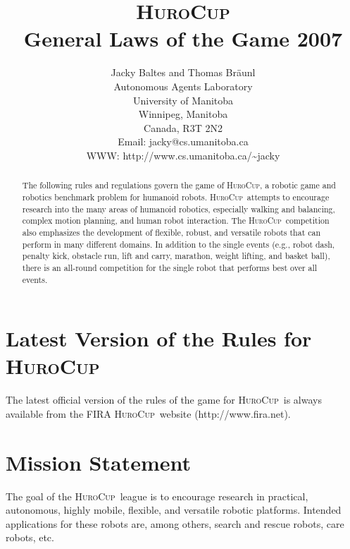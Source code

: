 \documentclass[12pt]{article}
\newcommand{\HuroCup}{\textsc{HuroCup}}
\begin{document}
\title{\HuroCup\\
  General Laws of the Game 2007}

\author{Jacky Baltes and Thomas Br\"aunl\\
Autonomous Agents Laboratory\\
University of Manitoba\\
Winnipeg, Manitoba\\
Canada, R3T 2N2\\
Email: jacky@cs.umanitoba.ca\\
WWW: http://www.cs.umanitoba.ca/\~{ }jacky
}

\maketitle
\begin{abstract}
The following rules and regulations govern the game of \HuroCup, a
robotic game and robotics benchmark problem for humanoid
robots. 
%
\HuroCup\ attempts to encourage research into the many areas
of humanoid robotics, especially walking and balancing, complex motion
planning, and human robot interaction.
%
The \HuroCup\ competition also emphasizes the development of flexible,
robust, and versatile robots that can perform in many different
domains. 
%
In addition to the single events (e.g., robot dash, penalty kick,
obstacle run, lift and carry, marathon, weight lifting, and basket
ball), there is an all-round competition for the single robot that
performs best over all events.
\end{abstract}

\section*{Latest Version of the Rules for \HuroCup}
\label{sec:updates}

The latest official version of the rules of the game for \HuroCup\ is
always available from the FIRA \HuroCup\ website (http://www.fira.net).

\newpage
\section{Mission Statement}

The goal of the \HuroCup\ league is to encourage research in
practical, autonomous, highly mobile, flexible, and versatile robotic
platforms. Intended applications for these robots are, among others,
search and rescue robots, care robots, etc.
\end{document}
